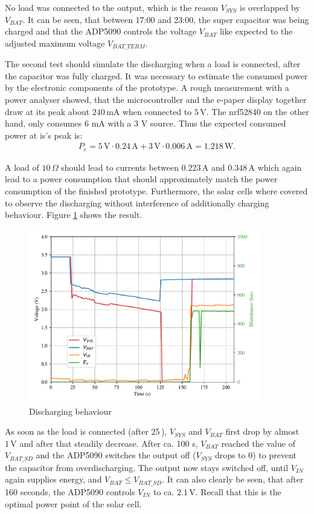 No load was connected to the output, which is the reason $V_{SYS}$ is overlapped by $V_{BAT}$.
It can be seen, that between 17:00 and 23:00, the super capacitor was being charged and
that the ADP5090 controls the voltage $V_{BAT}$ like expected to the adjusted maximum voltage $V_{BAT\_TERM}$.

The second test should simulate the discharging when a load is connected, after the capacitor was fully charged.
It was necessary to estimate the consumed power by the electronic components of the prototype.
A rough measurement with a power analyser showed, that the microcontroller and the e-paper display together draw at its peak about $240\,\text{mA}$ when connected to $5\,\text{V}$. The nrf52840 on the other hand, only consumes 6 mA with a 3 V source. Thus the expected consumed power at is's peak is:
\begin{align}
	P_{e} = 5\,\text{V}\cdot 0.24\,\text{A} + 3\,\text{V}\cdot 0.006\,\text{A} = 1.218\,\text{W}.
\end{align}
  

A load of $10\,\Omega$ should lead to currents between $0.223\,\text{A}$ and $0.348\,\text{A}$ which again lead to a power consumption that should approximately match the power consumption of the finished prototype.
Furthermore, the solar cells where covered to observe the discharging without interference of additionally charging behaviour.
Figure \ref{development:discharge} shows the result.
 
\begin{figure}[ht]
	\centering
	\includegraphics[width=0.9\textwidth]{4-development/hardware/graphics/entladen.pdf}
	\caption{Discharging behaviour\label{development:discharge}}
\end{figure}

As soon as the load is connected (after 25\,), $V_{SYS}$ and $V_{BAT}$ first drop by almost $1\,\text{V}$ and after that steadily decrease.
After ca. 100 s, $V_{BAT}$ reached the value of $V_{BAT\_SD}$ and the ADP5090 switches the output off ($V_{SYS}$ drops to 0) to prevent the capacitor from overdischarging.
The output now stays switched off, until $V_{IN}$ again supplies energy, and $V_{BAT} \le V_{BAT\_SD}$.
It can also clearly be seen, that after 160 seconds, the ADP5090 controls $V_{IN}$ to ca. $2.1\,\text{V}$. Recall that this is the optimal power point of the solar cell.
